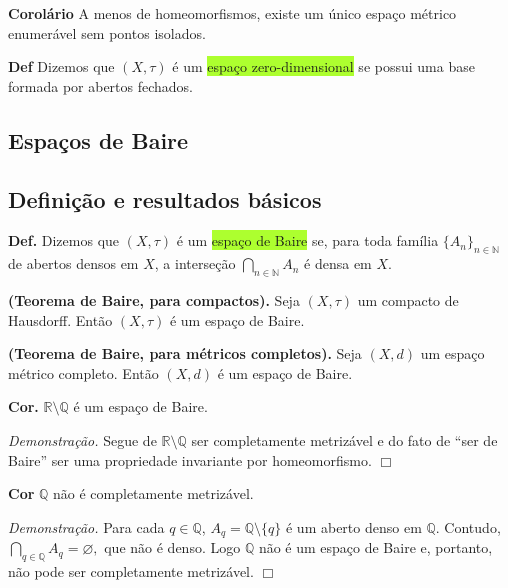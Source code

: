 \documentclass{article}
\begin{document}
\begin{landscape}
\begin{multicols}{3}
\medskip

\textbf{Corolário} A menos de homeomorfismos, existe um único espaço métrico enumerável sem pontos isolados.

\medskip

\textbf{Def} Dizemos que \((X,\tau)\) é um \colorbox{GreenYellow}{espaço zero-dimensional} se possui uma base formada por abertos fechados.

\medskip
\end{multicols}
\begin{center}
    
\section{Espaços de Baire}
\end{center}
\begin{multicols}{3}
    
\subsection{Definição e resultados básicos}
\textbf{Def.} Dizemos que \((X,\tau)\) é um \colorbox{GreenYellow}{espaço de Baire} se, para toda família \(\{A_n\}_{n\in\mathbb{N}}\) de abertos densos em \(X\), a interseção
$
\bigcap_{n\in\mathbb{N}}A_n
$
é densa em \(X\).

\medskip

\textbf{(Teorema de Baire, para compactos).} Seja \((X,\tau)\) um compacto de Hausdorff. Então \((X,\tau)\) é um espaço de Baire.

\medskip

\textbf{(Teorema de Baire, para métricos completos).} Seja \((X,d)\) um espaço métrico completo. Então \((X,d)\) é um espaço de Baire.

\medskip

\textbf{Cor.} \(\mathbb{R}\setminus\mathbb{Q}\) é um espaço de Baire.  

\emph{Demonstração.} Segue de \(\mathbb{R}\setminus\mathbb{Q}\) ser completamente metrizável e do fato de “ser de Baire” ser uma propriedade invariante por homeomorfismo. \(\Box\)

\medskip

\textbf{Cor} \(\mathbb{Q}\) não é completamente metrizável.  

\emph{Demonstração.} Para cada \(q\in\mathbb{Q}\), \(A_q=\mathbb{Q}\setminus\{q\}\) é um aberto denso em \(\mathbb{Q}\). Contudo,
$
\bigcap_{q\in\mathbb{Q}}A_q=\varnothing,
$
que não é denso. Logo \(\mathbb{Q}\) não é um espaço de Baire e, portanto, não pode ser completamente metrizável. \(\Box\)
\medskip


\end{multicols}
\end{landscape}
\end{document}
